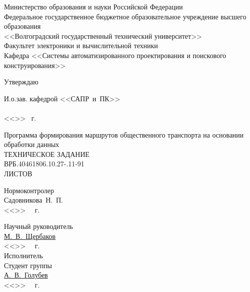
\thispagestyle{empty}
\begin{center}
    Министерство образования и науки Российской Федерации \\
    Федеральное государственное бюджетное образовательное учреждение высшего образования\\
    <<Волгоградский государственный технический университет>>\\
    Факультет электроники и вычислительной техники\\
    Кафедра <<Системы автоматизированного проектирования и поискового конструирования>>
    \vspace{1em}
\end{center}
\begin{flushright}
    \begin{center}
        \hspace*{10.5em}Утверждаю
    \end{center}
    И.о.зав. кафедрой <<САПР~и~ПК>>\\
    \quad{}\\
    <<\underline{\hspace{2em}}>> \underline{\hspace{7.5em}} \the\year\ г.
\end{flushright}
\begin{center}
    Программа формирования маршрутов общественного транспорта на основании обработки данных\\
    ТЕХНИЧЕСКОЕ ЗАДАНИЕ\\
    \vspace{2em}
    ВРБ.40461806.10.27-\SPECIFICATION.11-91\\
    ЛИСТОВ \SPAGES
\end{center}
\vspace{5em}
\begin{minipage}[t]{0.6\textwidth}
    \vspace{4em}
    \begin{flushleft}
        Нормоконтролер\\
        Садовникова~Н.~П.\\
        <<\LINE{1.5em}>>\ \LINE{7em} \the\year\ г.
    \end{flushleft}
\end{minipage}
\begin{minipage}[t]{0.39\textwidth}
    \begin{flushleft}
        Научный руководитель\\
        \underline{М.~В.~Щербаков\hspace{6em}}\\
        <<\LINE{1.5em}>>\ \LINE{7em} \the\year\ г.\\
        Исполнитель\\
        Студент группы\\
        \underline{А.~В.~Голубев\hspace{7em}}\\
        <<\LINE{1.5em}>>\ \LINE{7em} \the\year\ г.\\
    \end{flushleft}
\end{minipage}
